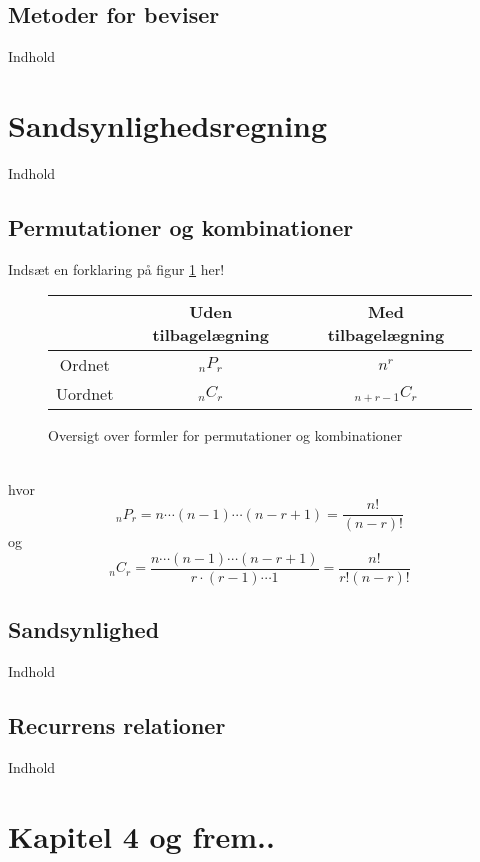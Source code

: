 \documentclass{article}
\begin{document}
  \subsection{Metoder for beviser}
    Indhold
\section{Sandsynlighedsregning}
  Indhold
  \subsection{Permutationer og kombinationer}
  Indsæt en forklaring på figur \ref{fig:perm} her!
  \begin{figure}[h!]
  \begin{center}
    \begin{tabular}{|c|c|c|}
    \hline
    & Uden tilbagelægning & Med tilbagelægning \\
    \hline
    Ordnet  & $_nP_r$ & $n^r$ \\
    \hline
    Uordnet & $_nC_r$ & $_{n+r-1}C_r$ \\
    \hline
    \end{tabular}
    \caption{Oversigt over formler for permutationer og kombinationer} \label{fig:perm}
    \end{center}
  \end{figure}\\
  hvor
  \begin{equation}
    _nP_r=n\cdots{}(n-1)\cdots{}(n-r+1) = \frac{n!}{(n-r)!}
  \end{equation}
  og
  \begin{equation}
    _nC_r=\frac{n\cdots (n-1) \cdots (n-r+1)}{r\cdot (r-1)\cdots 1} = \frac{n!}{r!(n-r)!}
  \end{equation}
  \subsection{Sandsynlighed}
    Indhold
  \subsection{Recurrens relationer}
    Indhold
\section{Kapitel 4 og frem..}
\end{document}
